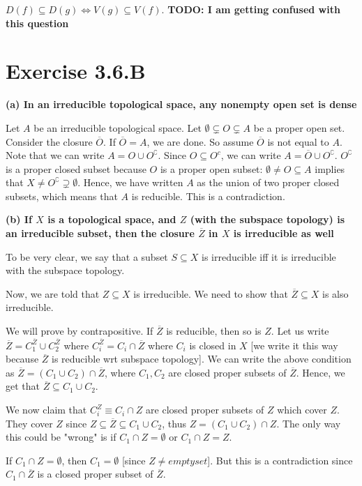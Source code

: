 \documentclass{book}
\newcommand{\c}{\complement} %
\theoremstyle{definition}
\begin{document}
$D(f) \subseteq D(g) \iff V(g) \subseteq V(f)$.
\textbf{TODO: I am getting confused with this question}

\section{Exercise 3.6.B}
\textbf{(a) In an irreducible topological space, any nonempty open set is dense}


Let $A$ be an irreducible topological space. Let $\emptyset \subsetneq O \subsetneq A$
be a proper open set.
Consider the closure $\overline{O}$. If $\overline{O} = A$, we are done.
So assume $\overline{O}$ is not equal to $A$.
Note that we can write $A = O \cup O^\c$. Since $O \subseteq O^c$, we can write
$A = \overline{O} \cup O^\c$. $O^\c$ is a proper closed subset because $O$ is
a proper open subset: $\emptyset \neq O \subseteq A$ implies that  $X \neq O^\c \supsetneq \emptyset$.
Hence, we have written $A$ as the union of two proper closed subsets, which means
that $A$ is reducible. This is a contradiction.

\textbf{(b) If $X$ is a topological space, and $Z$ (with the subspace topology) is an irreducible
subset, then the closure $\overline{Z}$ in $X$ is irreducible as well}

To be very clear, we say that a subset $S \subseteq X$ is irreducible iff
it is irreducible with the subspace topology.


Now, we are told that $Z \subseteq X$ is irreducible. We need to show
that $\overline{Z} \subseteq X$ is also irreducible. 

We will prove by contrapositive. If $\overline{Z}$ is reducible, then
so is $Z$. Let us write $\overline{Z} = C_1^{\overline Z} \cup C_2^{\overline Z}$
where $C_i^{\overline Z} = C_i \cap \overline Z$ where $C_i$ is closed in $X$
[we write it this way because $\overline{Z}$ is reducible wrt subspace topology].
We can write the above condition as $\overline{Z} = (C_1 \cup C_2) \cap \overline{Z}$,
where $C_1, C_2$ are closed proper subsets of $\overline{Z}$. Hence, we
get that $\overline{Z} \subseteq C_1 \cup C_2$.

We now claim that $C_i^Z \equiv C_i \cap Z$ are closed proper subsets of $Z$
which cover $Z$.  They cover $Z$ since  $Z \subseteq \overline Z \subseteq C_1 \cup C_2$,
thus $Z = (C_1 \cup C_2) \cap Z$. The only way this could be "wrong" is if
$C_1 \cap Z = \emptyset $ or $C_1 \cap Z = Z$. 

If $C_1 \cap Z = \emptyset$, then
$C_1 = \emptyset$ [since $Z \neq emptyset$]. But this is a contradiction since $C_1 \cap \overline{Z}$
is a closed proper subset of $\overline{Z}$.
\end{document}
